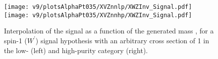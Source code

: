 \begin{figure}[!htb]
  \centering
    \texttt{[image: v9/plotsAlphaPt035/XVZnnlp/XWZInv\_Signal.pdf]}
    \texttt{[image: v9/plotsAlphaPt035/XVZnnhp/XWZInv\_Signal.pdf]}
  \caption{Interpolation of the signal as a function of the generated mass \mtVZ, for a spin-1 ($W^{'}$) signal hypothesis with an arbitrary cross section of 1 \pb in the low- (left) and high-purity category (right).}
  \label{fig:XWZInv_Signal}
\end{figure}



